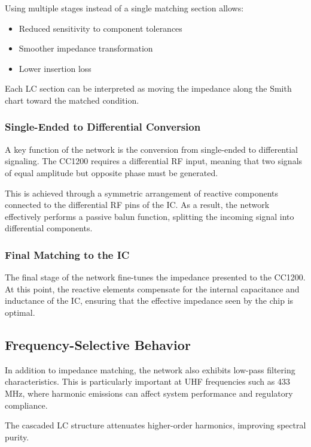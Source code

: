 Using multiple stages instead of a single matching section allows:
\begin{itemize}
    \item Reduced sensitivity to component tolerances
    \item Smoother impedance transformation
    \item Lower insertion loss
\end{itemize}

Each LC section can be interpreted as moving the impedance along the Smith chart toward the matched condition.

\subsubsection{Single-Ended to Differential Conversion}

A key function of the network is the conversion from single-ended to differential signaling. The CC1200 requires a differential RF input, meaning that two signals of equal amplitude but opposite phase must be generated.

This is achieved through a symmetric arrangement of reactive components connected to the differential RF pins of the IC. As a result, the network effectively performs a passive balun function, splitting the incoming signal into differential components.

\subsubsection{Final Matching to the IC}

The final stage of the network fine-tunes the impedance presented to the CC1200. At this point, the reactive elements compensate for the internal capacitance and inductance of the IC, ensuring that the effective impedance seen by the chip is optimal.

\subsection{Frequency-Selective Behavior}

In addition to impedance matching, the network also exhibits low-pass filtering characteristics. This is particularly important at UHF frequencies such as 433\,MHz, where harmonic emissions can affect system performance and regulatory compliance.

The cascaded LC structure attenuates higher-order harmonics, improving spectral purity.

